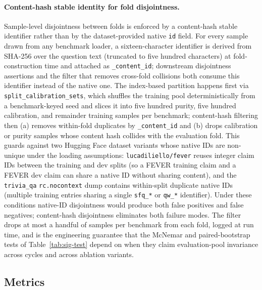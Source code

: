 \paragraph{Content-hash stable identity for fold disjointness.}
\label{par:content-hash-disjointness}
Sample-level disjointness between folds is enforced by a content-hash stable identifier rather than by the dataset-provided native \texttt{id} field. For every sample drawn from any benchmark loader, a sixteen-character identifier is derived from SHA-256 over the question text (truncated to five hundred characters) at fold-construction time and attached as \texttt{\_content\_id}; downstream disjointness assertions and the filter that removes cross-fold collisions both consume this identifier instead of the native one. The index-based partition happens first via \texttt{split\_calibration\_sets}, which shuffles the training pool deterministically from a benchmark-keyed seed and slices it into five hundred purity, five hundred calibration, and remainder training samples per benchmark; content-hash filtering then (a) removes within-fold duplicates by \texttt{\_content\_id} and (b) drops calibration or purity samples whose content hash collides with the evaluation fold. This guards against two Hugging Face dataset variants whose native IDs are non-unique under the loading assumptions: \texttt{lucadiliello/fever} reuses integer claim IDs between the training and dev splits (so a FEVER training claim and a FEVER dev claim can share a native ID without sharing content), and the \texttt{trivia\_qa} \texttt{rc.nocontext} dump contains within-split duplicate native IDs (multiple training entries sharing a single \texttt{sfq\_*} or \texttt{qw\_*} identifier). Under these conditions native-ID disjointness would produce both false positives and false negatives; content-hash disjointness eliminates both failure modes. The filter drops at most a handful of samples per benchmark from each fold, logged at run time, and is the engineering guarantee that the McNemar and paired-bootstrap tests of Table~\ref{tab:sig-test} depend on when they claim evaluation-pool invariance across cycles and across ablation variants.

\subsection{Metrics}
\label{sec:metrics}

